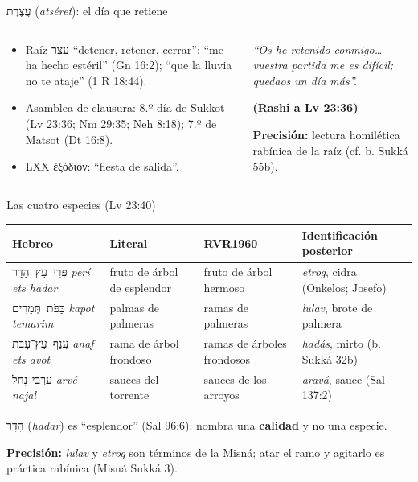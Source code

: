 \documentclass[hyperref={bookmarks=false},aspectratio=169]{beamer}
\newcommand{\heb}[1]{\mbox{\foreignlanguage{hebrew}{#1}}}
\newcommand{\grc}[1]{\foreignlanguage{ancientgreek}{#1}}
\newcommand{\destacar}[1]{\textbf{\textcolor{tierraroja}{#1}}}
\newcommand{\precision}[1]{{\footnotesize\color{sepia}\textbf{Precisión:} #1}}
\begin{document}
\begin{frame}{\heb{עֲצֶרֶת} (\emph{atséret}): el día que retiene}
\begin{columns}[t,onlytextwidth]
\begin{column}{0.52\textwidth}\small
\begin{itemize}
\item Raíz \heb{עצר} ``detener, retener, cerrar'': ``me ha hecho estéril'' (Gn 16:2); ``que la lluvia no te ataje'' (1 R 18:44).
\item Asamblea de clausura: 8.º día de Sukkot (Lv 23:36; Nm 29:35; Neh 8:18); 7.º de Matsot (Dt 16:8).
\item LXX \grc{ἐξόδιον}: ``fiesta de salida''.
\end{itemize}
\end{column}
\begin{column}{0.46\textwidth}
\begin{tcolorbox}[colback=papiro,colframe=mostaza!80!tierraroja,boxrule=0.8pt,arc=3pt,left=4pt,right=4pt]
\scriptsize\itshape ``Os he retenido conmigo\ldots{} vuestra partida me es difícil; quedaos un día más''.\par\hfill\upshape\textbf{\textcolor{tierraroja}{(Rashi a Lv 23:36)}}
\end{tcolorbox}
\precision{lectura homilética rabínica de la raíz (cf. b. Sukká 55b).}
\end{column}
\end{columns}
\end{frame}

\begin{frame}{Las cuatro especies (Lv 23:40)}
\scriptsize\renewcommand{\arraystretch}{1.2}
\begin{tabular}{@{}L{2.9cm}L{2.7cm}L{2.6cm}L{3.6cm}@{}}
\toprule
\textbf{Hebreo} & \textbf{Literal} & \textbf{RVR1960} & \textbf{Identificación posterior} \\ \midrule
\heb{פְּרִי עֵץ הָדָר} \emph{perí ets hadar} & fruto de árbol de esplendor & fruto de árbol hermoso & \emph{etrog}, cidra (Onkelos; Josefo) \\
\heb{כַּפֹּת תְּמָרִים} \emph{kapot temarim} & palmas de palmeras & ramas de palmeras & \emph{lulav}, brote de palmera \\
\heb{עֲנַף עֵץ־עָבֹת} \emph{anaf ets avot} & rama de árbol frondoso & ramas de árboles frondosos & \emph{hadás}, mirto (b. Sukká 32b) \\
\heb{עַרְבֵי־נָחַל} \emph{arvé najal} & sauces del torrente & sauces de los arroyos & \emph{aravá}, sauce (Sal 137:2) \\
\bottomrule
\end{tabular}\par\medskip
\small \heb{הָדָר} (\emph{hadar}) es ``esplendor'' (Sal 96:6): nombra una \destacar{calidad} y no una especie.\par\smallskip
\precision{\emph{lulav} y \emph{etrog} son términos de la Misná; atar el ramo y agitarlo es práctica rabínica (Misná Sukká 3).}
\end{frame}
\end{document}
